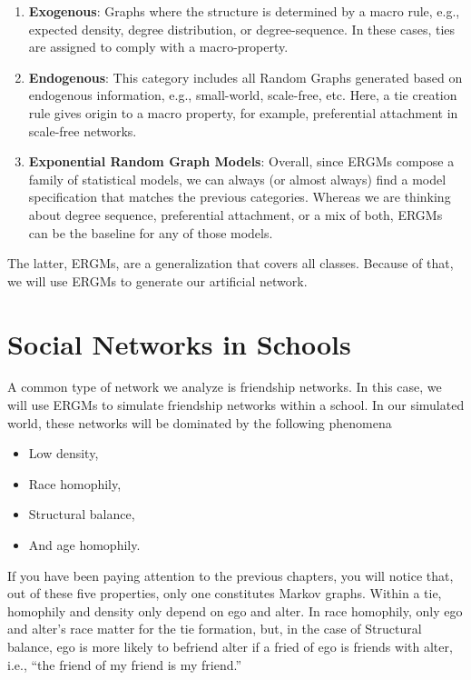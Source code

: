 \documentclass[]{book}
\providecommand{\tightlist}{%
  \setlength{\itemsep}{0pt}\setlength{\parskip}{0pt}}
\begin{document}
\begin{enumerate}
\def\labelenumi{\arabic{enumi}.}
\item
  \textbf{Exogenous}: Graphs where the structure is determined by a macro rule, e.g.,
  expected density, degree distribution, or degree-sequence. In these cases,
  ties are assigned to comply with a macro-property.
\item
  \textbf{Endogenous}: This category includes all Random Graphs generated based
  on endogenous information, e.g., small-world, scale-free, etc. Here, a tie
  creation rule gives origin to a macro property, for example, preferential attachment
  in scale-free networks.
\item
  \textbf{Exponential Random Graph Models}: Overall, since ERGMs compose a family
  of statistical models, we can always (or almost always) find a model specification
  that matches the previous categories. Whereas we are thinking about degree sequence,
  preferential attachment, or a mix of both, ERGMs can be the baseline for any of
  those models.
\end{enumerate}

The latter, ERGMs, are a generalization that covers all classes. Because of that,
we will use ERGMs to generate our artificial network.

\hypertarget{social-networks-in-schools}{%
\section{Social Networks in Schools}\label{social-networks-in-schools}}

A common type of network we analyze is friendship networks. In this case,
we will use ERGMs to simulate friendship networks within a school. In our
simulated world, these networks will be dominated by the following phenomena

\begin{itemize}
\tightlist
\item
  Low density,
\item
  Race homophily,
\item
  Structural balance,
\item
  And age homophily.
\end{itemize}

If you have been paying attention to the previous chapters, you will notice that,
out of these five properties, only one constitutes Markov graphs. Within a tie,
homophily and density only depend on ego and alter. In race homophily, only ego
and alter's race matter for the tie formation, but, in the case of Structural
balance, ego is more likely to befriend alter if a fried of ego is friends with alter,
i.e., ``the friend of my friend is my friend.''
\end{document}
